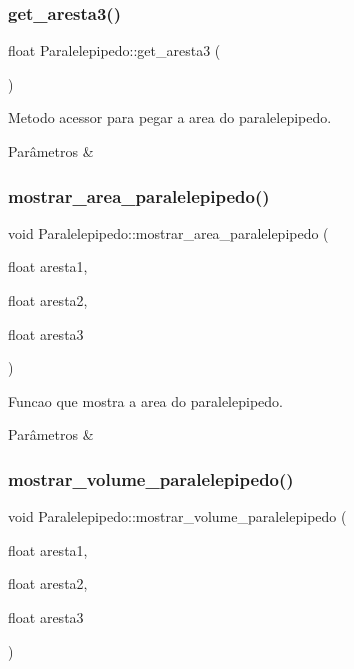 \subsubsection{\texorpdfstring{get\+\_\+aresta3()}{get\_aresta3()}}
{\footnotesize\ttfamily float Paralelepipedo\+::get\+\_\+aresta3 (\begin{DoxyParamCaption}{ }\end{DoxyParamCaption})}



Metodo acessor para pegar a area do paralelepipedo. 


\begin{DoxyParams}{Parâmetros}
{\em } & \\
\hline
\end{DoxyParams}
\mbox{\label{classParalelepipedo_a2dec8c7de5c7780f9896f3ae25b7f680}} 
\subsubsection{\texorpdfstring{mostrar\+\_\+area\+\_\+paralelepipedo()}{mostrar\_area\_paralelepipedo()}}
{\footnotesize\ttfamily void Paralelepipedo\+::mostrar\+\_\+area\+\_\+paralelepipedo (\begin{DoxyParamCaption}\item[{float}]{aresta1,  }\item[{float}]{aresta2,  }\item[{float}]{aresta3 }\end{DoxyParamCaption})}



Funcao que mostra a area do paralelepipedo. 


\begin{DoxyParams}{Parâmetros}
{\em } & \\
\hline
\end{DoxyParams}
\mbox{\label{classParalelepipedo_a71b8363aa56984695845eb758b4545fd}} 
\subsubsection{\texorpdfstring{mostrar\+\_\+volume\+\_\+paralelepipedo()}{mostrar\_volume\_paralelepipedo()}}
{\footnotesize\ttfamily void Paralelepipedo\+::mostrar\+\_\+volume\+\_\+paralelepipedo (\begin{DoxyParamCaption}\item[{float}]{aresta1,  }\item[{float}]{aresta2,  }\item[{float}]{aresta3 }\end{DoxyParamCaption})}



